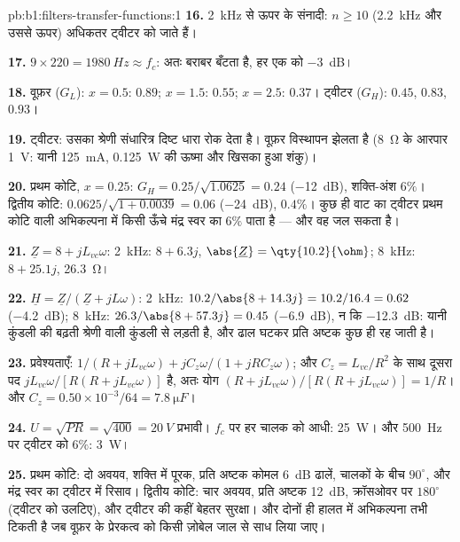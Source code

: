 \begin{solution}{pb:b1:filters-transfer-functions:1}
\textbf{16.} \qty{2}{kHz} से ऊपर के संनादी: $n \geq 10$ (\qty{2.2}{kHz}
और उससे ऊपर) अधिकतर ट्वीटर को जाते हैं।

\textbf{17.} $9 \times 220 = \qty{1980}{Hz} \approx f_c$: अतः बराबर बँटता है,
हर एक को \qty{-3}{dB}।

\textbf{18.} वूफ़र ($G_L$): $x = 0.5$: $0.89$; $x = 1.5$: $0.55$; $x = 2.5$:
$0.37$। ट्वीटर ($G_H$): $0.45$, $0.83$, $0.93$।

\textbf{19.} ट्वीटर: उसका श्रेणी संधारित्र दिष्ट धारा रोक देता है। वूफ़र
विस्थापन झेलता है (\qty{8}{\ohm} के आरपार \qty{1}{V}: यानी \qty{125}{mA},
\qty{0.125}{W} की ऊष्मा और खिसका हुआ शंकु)।

\textbf{20.} प्रथम कोटि, $x = 0.25$: $G_H = 0.25/\sqrt{1.0625} = 0.24$
(\qty{-12}{dB}), शक्ति-अंश $6\%$। द्वितीय कोटि: $0.0625/\sqrt{1 +
0.0039} = 0.06$ (\qty{-24}{dB}), $0.4\%$। कुछ ही वाट का ट्वीटर प्रथम कोटि
वाली अभिकल्पना में किसी ऊँचे मंद्र स्वर का $6\%$ पाता है --- और वह
जल सकता है।

\textbf{21.} $\underline Z = 8 + jL_{vc}\omega$: \qty{2}{kHz}: $8 + 6.3j$,
$\abs{\underline Z} = \qty{10.2}{\ohm}$; \qty{8}{kHz}: $8 + 25.1j$,
\qty{26.3}{\ohm}।

\textbf{22.} $\underline H = \underline Z/(\underline Z + jL\omega)$:
\qty{2}{kHz}: $10.2/\abs{8 + 14.3j} = 10.2/16.4 = 0.62$ (\qty{-4.2}{dB});
\qty{8}{kHz}: $26.3/\abs{8 + 57.3j} = 0.45$ (\qty{-6.9}{dB}), न कि
\qty{-12.3}{dB}: यानी कुंडली की बढ़ती  श्रेणी वाली कुंडली से लड़ती है,
और ढाल घटकर प्रति अष्टक कुछ ही  रह जाती है।

\textbf{23.} प्रवेश्यताएँ: $1/(R + jL_{vc}\omega) + jC_z\omega/(1 + jRC_z\omega)$;
और $C_z = L_{vc}/R^2$ के साथ दूसरा पद $jL_{vc}\omega/[R(R +
jL_{vc}\omega)]$ है, अतः योग $(R + jL_{vc}\omega)/[R(R + jL_{vc}\omega)]
= 1/R$। और $C_z = 0.50\times10^{-3}/64 = \qty{7.8}{\micro F}$।

\textbf{24.} $U = \sqrt{PR} = \sqrt{400} = \qty{20}{V}$ प्रभावी। $f_c$ पर हर
चालक को आधी: \qty{25}{W}। और \qty{500}{Hz} पर ट्वीटर को $6\%$:
\qty{3}{W}।

\textbf{25.} प्रथम कोटि: दो अवयव, शक्ति में पूरक, प्रति अष्टक कोमल
\qty{6}{dB} ढालें, चालकों के बीच $90^\circ$, और मंद्र स्वर का ट्वीटर में
रिसाव। द्वितीय कोटि: चार अवयव, प्रति अष्टक \qty{12}{dB}, क्रॉसओवर पर
$180^\circ$ (ट्वीटर को उलटिए), और ट्वीटर की कहीं बेहतर सुरक्षा। और दोनों ही
हालत में अभिकल्पना तभी टिकती है जब वूफ़र के प्रेरकत्व को किसी ज़ोबेल जाल से
साध लिया जाए।
\end{solution}
